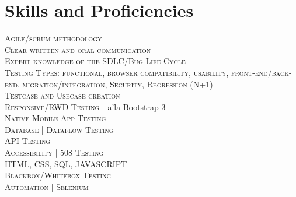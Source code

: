 \documentclass[a4paper,10pt]{article}
\begin{document}
\section{Skills and Proficiencies}
\begin{flushleft}
\textsc{Agile/scrum methodology}\\ \textsc{Clear written and oral communication}\\ \textsc{Expert knowledge of the SDLC/Bug Life Cycle}\\ \textsc{Testing Types: functional, browser compatibility, usability, front-end/back-end, migration/integration, Security, Regression (N+1)}\\ \textsc{Testcase and Usecase creation}\\ \textsc{Responsive/RWD Testing} - a'la {Bootstrap 3}\\ \textsc{Native Mobile App Testing}\\ \textsc{Database | Dataflow Testing}\\ \textsc{API Testing}\\ \textsc{Accessibility | 508 Testing}\\  \textsc{HTML, CSS, SQL, JAVASCRIPT}\\\textsc{Blackbox/Whitebox Testing}\\ \textsc{Automation | Selenium}\\ 
\end{flushleft}


\vspace{115 mm}
\begin{center}
\end{center}
\end{document}
